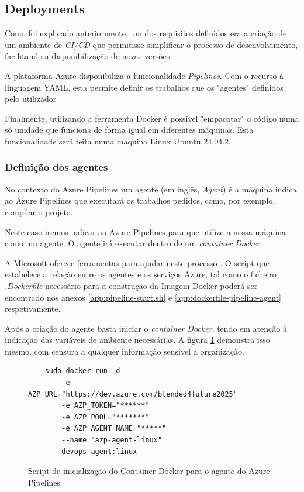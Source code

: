 \subsection{Deployments}

Como foi explicado anteriormente, um dos requisitos definidos  era a criação de um ambiente de \textit{CI/CD} que permitisse simplificar o processo de desenvolvimento, facilitando a disponibilização de novas versões.

A plataforma Azure disponibiliza a funcionalidade \textit{Pipelines}. Com o recurso à linguagem YAML, esta permite definir os trabalhos que os "agentes" definidos pelo utilizador

Finalmente, utilizando a ferramenta Docker é possível "empacotar" o código numa só unidade que funciona de forma igual em diferentes máquinas. Esta funcionalidade será feita numa máquina Linux Ubuntu 24.04.2. 

\subsubsection{Definição dos agentes}

No contexto do Azure Pipelines um agente (em inglês, \textit{Agent}) é a máquina indica ao Azure Pipelines que executará os trabalhos pedidos, como, por exemplo, compilar o projeto. 

Neste caso iremos indicar ao Azure Pipelines para que utilize a nossa máquina como um agente. O agente irá executar dentro de um \textit{container Docker}.

A Microsoft oferece ferramentas para ajudar neste processo \cite{run-a-self-hosted-agent-in-docker}. O script que estabelece a relação entre os agentes e os serviços Azure, tal como o ficheiro \textit{.Dockerfile} necessário para a construção da Imagem Docker poderá ser encontrado nos anexos \ref{app:pipeline-start.sh} e \ref{app:dockerfile-pipeline-agent} respetivamente.

Após a criação do agente basta iniciar o \textit{container Docker}, tendo em atenção à indicação das variáveis de ambiente necessárias. A figura \ref{fig:start-docker-agent} demonstra isso mesmo, com censura a qualquer informação sensivel à organização.

\begin{figure}[h!tbp]
    

\begin{lstlisting}
    sudo docker run -d 
        -e AZP_URL="https://dev.azure.com/blended4future2025" 
        -e AZP_TOKEN="******" 
        -e AZP_POOL="*******" 
        -e AZP_AGENT_NAME="*****" 
        --name "azp-agent-linux" 
        devops-agent:linux
\end{lstlisting}


\caption{Script de inicialização do Container Docker para o agente do Azure Pipelines}
\label{fig:start-docker-agent}

\end{figure}


